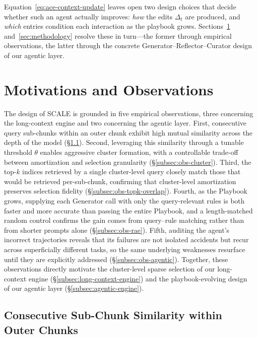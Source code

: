 \documentclass[10pt,conference]{IEEEtran}
\begin{document}
Equation~\eqref{eq:ace-context-update} leaves open two design choices that
decide whether such an agent actually improves: \emph{how} the edits
$\Delta_t$ are produced, and \emph{which} entries condition each
interaction as the playbook grows. Sections~\ref{sec:motivations}
and~\ref{sec:methodology} resolve these in turn---the former through
empirical observations, the latter through the concrete
Generator--Reflector--Curator design of our agentic layer.

\section{Motivations and Observations}
\label{sec:motivations}

The design of SCALE is grounded in five empirical observations, three
concerning the long-context engine and two concerning the agentic layer.
First, consecutive query sub-chunks within an outer chunk exhibit high
mutual similarity across the depth of the model
(§\ref{subsec:obs-similarity}). Second, leveraging this similarity
through a tunable threshold $\theta$ enables aggressive cluster
formation, with a controllable trade-off between amortization and
selection granularity (§\ref{subsec:obs-cluster}). Third, the top-$k$
indices retrieved by a single cluster-level query closely match those
that would be retrieved per-sub-chunk, confirming that cluster-level
amortization preserves selection fidelity
(§\ref{subsec:obs-topk-overlap}). Fourth, as the Playbook grows,
supplying each Generator call with only the query-relevant rules is both
faster and more accurate than passing the entire Playbook, and a
length-matched random control confirms the gain comes from query--rule
matching rather than from shorter prompts alone
(§\ref{subsec:obs-rae}). Fifth, auditing the
agent's incorrect trajectories reveals that its failures are not
isolated accidents but recur across superficially different tasks, so
the same underlying weaknesses resurface until they are explicitly
addressed (§\ref{subsec:obs-agentic}). Together, these observations directly
motivate the cluster-level sparse selection of our long-context engine
(§\ref{subsec:long-context-engine}) and the playbook-evolving design of our
agentic layer (§\ref{subsec:agentic-engine}).


\subsection{Consecutive Sub-Chunk Similarity within Outer Chunks}
\label{subsec:obs-similarity}
\end{document}
